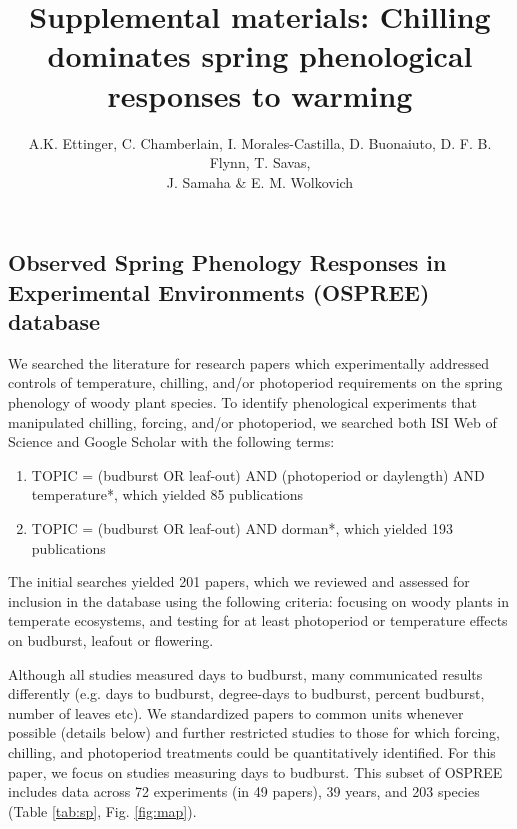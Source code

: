 \documentclass{article}
\begin{document}
\title{Supplemental materials:  Chilling dominates spring phenological responses to warming} 

\author{A.K. Ettinger, C. Chamberlain, I. Morales-Castilla, D. Buonaiuto, D. F. B. Flynn, T. Savas, \\J. Samaha \& E. M. Wolkovich}
\maketitle  %
\renewcommand{\thetable}{S\arabic{table}}
\renewcommand{\thefigure}{S\arabic{figure}}

\subsection*{Observed Spring Phenology Responses in Experimental Environments (OSPREE) database}
\par We searched the literature for research papers which experimentally addressed controls of temperature, chilling, and/or photoperiod requirements on the spring phenology of woody plant species. To identify phenological experiments that manipulated chilling, forcing, and/or photoperiod, we searched both ISI Web of Science and Google Scholar with the following terms: 
\begin{enumerate}
\item TOPIC = (budburst OR leaf-out) AND (photoperiod or daylength) AND temperature*, which yielded 85 publications

\item TOPIC = (budburst OR leaf-out) AND dorman*, which yielded 193 publications
\end{enumerate}



The initial searches yielded 201 papers, which we reviewed and assessed for inclusion in the database using the following criteria: focusing on woody plants in temperate ecosystems, and testing for at least photoperiod or temperature effects on budburst, leafout or 
flowering. 
\par Although all studies measured days to budburst, many communicated results differently (e.g. days to budburst, degree-days to budburst, percent budburst, number of leaves etc). We standardized papers to common units whenever possible (details below) and further restricted studies to those for which forcing, chilling, and photoperiod treatments could be quantitatively identified. For this paper, we focus on studies measuring days to budburst. This subset of OSPREE includes data across 72 experiments (in 49 papers), 39 years, and 203 species (Table \ref{tab:sp}, Fig. \ref{fig:map}).
\end{document}
